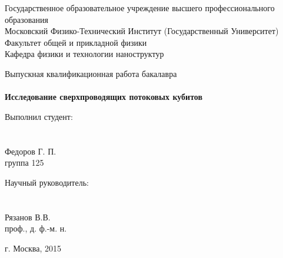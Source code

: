 \documentclass[12pt, twoside]{report}
\numberwithin{equation}{section}
\numberwithin{figure}{section}
\begin{document}
\newif\ifdraft
\drafttrue

\ifdraft

\begin{titlepage}
\begin{center}
Государственное образовательное учреждение высшего профессионального образования\\
Московский Физико-Технический Институт (Государственный Университет)\\
Факультет общей и прикладной физики\\
Кафедра физики и технологии наноструктур\\
\end{center}

\vspace{5cm}

\begin{center}

Выпускная квалификационная работа бакалавра\\~\\
\Large \textbf{Исследование сверхпроводящих потоковых кубитов}
\end{center}

\vspace{4cm}
\begin{center}
\begin{minipage}{0.45\textwidth}
\begin{center}
Выполнил студент:\\~\\~\\
Федоров Г. П.\\
группа 125
\end{center}
\end{minipage}
\begin{minipage}{0.45\textwidth}
\begin{center}
Научный руководитель:\\~\\~\\
Рязанов В.В.\\
проф., д. ф.-м. н.
\end{center}
\end{minipage}
\end{center}

\vspace{\fill}

\begin{center}
г. Москва, 2015
\end{center}
\end{titlepage}
\end{document}
